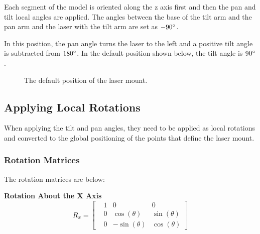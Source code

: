 \documentclass[12pt, letterpaper]{article}
\begin{document}
			Each segment of the model is oriented along the z axis first and then the pan and tilt local angles are applied. The angles between the base of the tilt arm and the pan arm and the laser with the tilt arm are set as $-90 \degree$.
			
			In this position, the pan angle turns the laser to the left and a positive tilt angle is subtracted from $180 \degree$. In the default position shown below, the tilt angle is $90 \degree$.
			
			\begin{figure}[ht]
				\centering
				\caption{The default position of the laser mount.}
			\end{figure}
		
		\subsection{Applying Local Rotations}
			When applying the tilt and pan angles, they need to be applied as local rotations and converted to the global positioning of the points that define the laser mount.
			\subsubsection{Rotation Matrices}
				The rotation matrices are below:
				
				\textbf{Rotation About the X Axis}
				\begin{equation*}
				R_x = 
					\begin{bmatrix}
						&1 &0 &0 \\
    					&0 &\cos(\theta) &\sin(\theta) \\
    					&0 &-\sin(\theta) &\cos(\theta)
					\end{bmatrix}
				\end{equation*}
				
\end{document}
